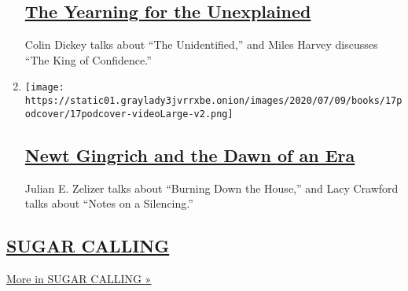 \begin{enumerate}
  \hypertarget{the-yearning-for-the-unexplained}{%
  \subsection{\texorpdfstring{\href{/2020/07/24/books/review/podcast-colin-dickey-unexplained-miles-harvey-king-of-confidence.html}{The
  Yearning for the
  Unexplained}}{The Yearning for the Unexplained}}\label{the-yearning-for-the-unexplained}}

  Colin Dickey talks about ``The Unidentified,'' and Miles Harvey
  discusses ``The King of Confidence.''
\item
  \texttt{[image: https://static01.graylady3jvrrxbe.onion/images/2020/07/09/books/17podcover/17podcover-videoLarge-v2.png]}

  \hypertarget{newt-gingrich-and-the-dawn-of-an-era}{%
  \subsection{\texorpdfstring{\href{/2020/07/17/books/review/podcast-julian-zelizer-burning-down-house-newt-gingrich-notes-silencing-lacy-crawford.html}{Newt
  Gingrich and the Dawn of an
  Era}}{Newt Gingrich and the Dawn of an Era}}\label{newt-gingrich-and-the-dawn-of-an-era}}

  Julian E. Zelizer talks about ``Burning Down the House,'' and Lacy
  Crawford talks about ``Notes on a Silencing.''
\end{enumerate}

\hypertarget{sugar-calling}{%
\subsection{\texorpdfstring{\href{/column/sugar-calling}{SUGAR
CALLING}}{SUGAR CALLING}}\label{sugar-calling}}

\href{/column/sugar-calling}{More in SUGAR CALLING »}

